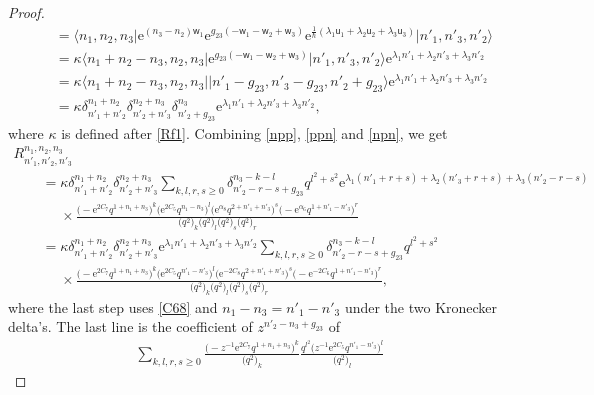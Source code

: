 \documentclass[pdftex]{sigma}
\newcommand{\e}{{\mathrm e}}
\newcommand{\uu}{{\mathsf u}}
\newcommand{\ww}{{\mathsf w}}
\numberwithin{equation}{section}
\begin{document}
\begin{proof}
\begin{gather}
\qquad=
 \langle n_1,n_2,n_3 |
\e^{(n_3-n_2)\ww_1}
\e^{g_{23}(-\ww_1-\ww_2+\ww_3)}
\e^{\tfrac{1}{\hbar}(\lambda_1\uu_1+\lambda_2\uu_2+\lambda_3\uu_3)}
 \bigl|n'_1, n'_3, n'_2\bigr\rangle
 \nonumber\\
\qquad=
\kappa \langle n_1+n_2-n_3, n_2,n_3|\e^{g_{23}(-\ww_1-\ww_2+\ww_3)}
 \bigl|n'_1, n'_3, n'_2\bigr\rangle \e^{\lambda_1 n'_1+\lambda_2n'_3+\lambda_3 n'_2}
 \nonumber\\
\qquad=
\kappa \langle n_1+n_2-n_3, n_2,n_3|
 \bigl|n'_1-g_{23}, n'_3-g_{23}, n'_2+g_{23}\bigr\rangle \e^{\lambda_1 n'_1+\lambda_2n'_3+\lambda_3 n'_2}
 \nonumber\\
\qquad=
 \kappa \delta^{n_1+n_2}_{n'_1+n'_2} \delta^{n_2+n_3}_{n'_2+n'_3} \delta^{n_3}_{n'_2+g_{23}}
 \e^{\lambda_1 n'_1+\lambda_2n'_3+\lambda_3 n'_2},
 \label{npn}
\end{gather}
where $\kappa$ is defined after \eqref{Rf1}.
Combining \eqref{npp}, \eqref{ppn} and \eqref{npn}, we get
\begin{gather*}
R^{n_1, n_2, n_3}_{n'_1, n'_2, n'_3}
\nonumber \\
\qquad= \kappa \delta^{n_1+n_2}_{n'_1+n'_2} \delta^{n_2+n_3}_{n'_2+n'_3}
\sum_{k,l,r,s\ge 0}\delta^{n_3-k-l}_{n'_2-r-s+g_{23}} q^{l^2+s^2}
\e^{\lambda_1(n'_1+r+s)+\lambda_2(n'_3+r+s)+\lambda_3(n'_2-r-s)}
\nonumber \\
\phantom{\qquad=}{} \times \frac{\bigl(-\e^{2C_7}q^{1+n_1+n_3}\bigr)^k\bigl(\e^{2C_5}q^{n_1-n_3}\bigr)^l
\bigl(\e^{\alpha_8}q^{2+n'_1+n'_3}\bigr)^s\bigl(-\e^{\alpha_6}q^{1+n'_1-n'_3}\bigr)^r}{\bigl(q^2\bigr)_k\bigl(q^2\bigr)_l\bigl(q^2\bigr)_s\bigl(q^2\bigr)_r}
\nonumber\\
\qquad= \kappa \delta^{n_1+n_2}_{n'_1+n'_2} \delta^{n_2+n_3}_{n'_2+n'_3}
 \e^{\lambda_1n'_1+\lambda_2n'_3+\lambda_3n'_2}
 \sum_{k,l,r,s\ge 0}\delta^{n_3-k-l}_{n'_2-r-s+g_{23}} q^{l^2+s^2}
\nonumber \\
\phantom{\qquad=}{}\times \frac{\bigl(-\e^{2C_7}q^{1+n_1+n_3}\bigr)^k\bigl(\e^{2C_5}q^{n'_1-n'_3}\bigr)^l
\bigl(\e^{-2C_8}q^{2+n'_1+n'_3}\bigr)^s\bigl(-\e^{-2C_6}q^{1+n'_1-n'_3}\bigr)^r}{\bigl(q^2\bigr)_k\bigl(q^2\bigr)_l\bigl(q^2\bigr)_s\bigl(q^2\bigr)_r},
\end{gather*}
where the last step uses \eqref{C68} and $n_1-n_3=n'_1-n'_3$ under the two Kronecker delta's.
The last line is the coefficient of $z^{n'_2-n_3+g_{23}}$ of
\begin{gather*}
\sum_{k,l,r,s\ge 0}
\frac{\bigl(-z^{-1}\e^{2C_7}q^{1+n_1+n_3}\bigr)^k}{\bigl(q^2\bigr)_k}
\frac{q^{l^2}\bigl(z^{-1}\e^{2C_5}q^{n'_1-n'_3}\bigr)^l}{\bigl(q^2\bigr)_l}

\end{gather*}
\end{proof}
\end{document}
